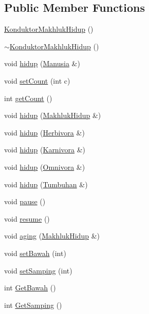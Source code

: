\subsection*{Public Member Functions}
\begin{DoxyCompactItemize}
\item 
\hyperlink{class_konduktor_makhluk_hidup_a2b85d7afd1474acec8d394a5e10cecd6}{Konduktor\+Makhluk\+Hidup} ()
\item 
\hyperlink{class_konduktor_makhluk_hidup_a3263d0b5c29733e7b4b04a5402957649}{$\sim$\+Konduktor\+Makhluk\+Hidup} ()
\item 
void \hyperlink{class_konduktor_makhluk_hidup_a87e20c1fac7f69730e1f800928fdab59}{hidup} (\hyperlink{class_manusia}{Manusia} \&)
\item 
void \hyperlink{class_konduktor_makhluk_hidup_aa354f1666205cd60c3769e33e7d797ba}{set\+Count} (int c)
\item 
int \hyperlink{class_konduktor_makhluk_hidup_ac404a4378cbd21ddc557ffd0496c322d}{get\+Count} ()
\item 
void \hyperlink{class_konduktor_makhluk_hidup_a60166836c3639da40a13b3802c70dc18}{hidup} (\hyperlink{class_makhluk_hidup}{Makhluk\+Hidup} \&)
\item 
void \hyperlink{class_konduktor_makhluk_hidup_a6db50a642d5f184ca11aaeb6e275797f}{hidup} (\hyperlink{class_herbivora}{Herbivora} \&)
\item 
void \hyperlink{class_konduktor_makhluk_hidup_a46e2bf54054641c6c8b377ef4052da39}{hidup} (\hyperlink{class_karnivora}{Karnivora} \&)
\item 
void \hyperlink{class_konduktor_makhluk_hidup_a54ce9beb02fffa0320fd8f8a1315e255}{hidup} (\hyperlink{class_omnivora}{Omnivora} \&)
\item 
void \hyperlink{class_konduktor_makhluk_hidup_a247cde5e3f3e8bf9ffa015b90e29fe38}{hidup} (\hyperlink{class_tumbuhan}{Tumbuhan} \&)
\item 
void \hyperlink{class_konduktor_makhluk_hidup_a90086da731ab404c57c96db90d6bb968}{pause} ()
\item 
void \hyperlink{class_konduktor_makhluk_hidup_af1086cb49d657605bb998db36abec897}{resume} ()
\item 
void \hyperlink{class_konduktor_makhluk_hidup_aa241caf5c346f96f9717183dd60b9414}{aging} (\hyperlink{class_makhluk_hidup}{Makhluk\+Hidup} \&)
\item 
void \hyperlink{class_konduktor_makhluk_hidup_aa299db55a0e7ab426d2ba61bda3b84a5}{set\+Bawah} (int)
\item 
void \hyperlink{class_konduktor_makhluk_hidup_aa120358e949c0dc53286cbff0d5ea4e3}{set\+Samping} (int)
\item 
int \hyperlink{class_konduktor_makhluk_hidup_a4c9b65dc15d4b3b3a41b885b5030009c}{Get\+Bawah} ()
\item 
int \hyperlink{class_konduktor_makhluk_hidup_a453d35d38b281010dead4ea842be9360}{Get\+Samping} ()
\end{DoxyCompactItemize}



